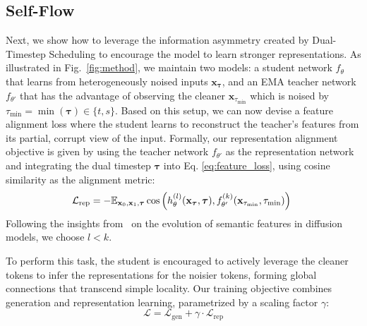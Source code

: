 \subsection{Self-Flow}
\label{ref:self_flow}
Next, we show how to leverage the information asymmetry created by Dual-Timestep Scheduling to encourage the model to learn stronger representations. 
As illustrated in Fig.~\ref{fig:method}, we maintain two models: a student network $f_\theta$ that learns from heterogeneously noised inputs $\mathbf{x}_{\boldsymbol{\tau}}$, and an EMA teacher network $f_{\theta'}$ that has the advantage of observing the cleaner $\mathbf{x}_{{\tau}_{\min}}$ which is noised by $\tau_{\min} = \min(\boldsymbol{\tau}) \in \{t, s \}$.
Based on this setup, we can now devise a feature alignment loss where the student learns to reconstruct the teacher's features from its partial, corrupt view of the input.
Formally, our representation alignment objective is given by using the teacher network $f_{\theta'}$ as the representation network and integrating the dual timestep $\boldsymbol{\tau}$ into Eq. \ref{eq:feature_loss}, using cosine similarity as the alignment metric:
\begin{equation}
\hspace{-5pt}
\mathcal{L}_{\text{rep}} = -\mathbb{E}_{\mathbf{x}_0, \mathbf{x}_1, \boldsymbol{\tau}} \cos \left(h_\theta^{(l)}(\mathbf{x}_{\boldsymbol{\tau}}, \boldsymbol{\tau}), f_{\theta'}^{(k)}(\mathbf{x}_{{\tau}_{\min}}, {\tau}_{\min}) \right) \hspace{-1pt}
\label{eq:representation_loss}
\end{equation}
Following the insights from~\citet{repa,sra} on the evolution of semantic features in diffusion models, we choose $l < k$.

To perform this task, the student is encouraged to actively leverage the cleaner tokens to infer the representations for the noisier tokens, forming global connections that transcend simple locality.
Our training objective combines generation and representation learning, parametrized by a scaling factor $\gamma$:
\begin{equation}
    \label{eq:loss}
    \mathcal{L} = \mathcal{L}_{\text{gen}} + \gamma \cdot \mathcal{L}_{\text{rep}}
\end{equation}